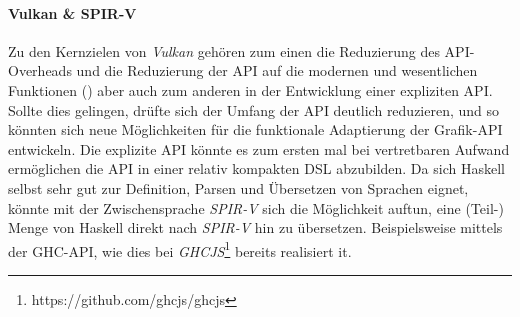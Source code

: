 \paragraph{Vulkan \& SPIR-V} Zu den Kernzielen von \textit{Vulkan} gehören zum einen die Reduzierung des \acs{API}-Overheads und die Reduzierung der \ac{API} auf die modernen und wesentlichen Funktionen () aber auch zum anderen in der Entwicklung einer expliziten \acs{API}. Sollte dies gelingen, drüfte sich der Umfang der \acs{API} deutlich reduzieren, und so könnten sich neue Möglichkeiten für die funktionale Adaptierung der Grafik-\acs{API} entwickeln. Die explizite \ac{API} könnte es zum ersten mal bei vertretbaren Aufwand ermöglichen die \ac{API} in einer relativ kompakten \ac{DSL} abzubilden. Da sich Haskell selbst sehr gut zur Definition, Parsen und Übersetzen von Sprachen eignet, könnte mit der Zwischensprache \textit{SPIR-V} sich die Möglichkeit auftun, eine (Teil-) Menge von Haskell direkt nach \textit{SPIR-V} hin zu übersetzen. Beispielsweise mittels der \acf{GHC}-\acs{API}, wie dies bei \textit{GHCJS}\footnote{https://github.com/ghcjs/ghcjs} bereits realisiert it.
